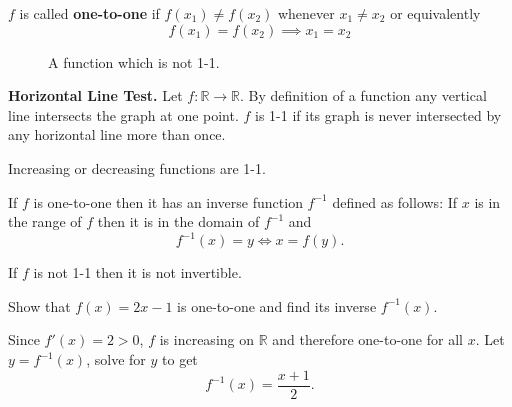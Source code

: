\documentclass[../main.tex]{subfiles}
\begin{document}
  \begin{definition}
    $f$ is called \textbf{one-to-one} if $f(x_1) \neq f(x_2)$ whenever $x_1 \neq x_2$ or equivalently
    \[
      f(x_1) = f(x_2) \implies x_1 = x_2
    \]
  \end{definition}

  \begin{figure}[H]
   \centering
   
   \caption{A function which is not 1-1.}
 \end{figure}

 \textbf{Horizontal Line Test.}
 Let $f: \mathbb{R} \to \mathbb{R}$. By definition of a function any vertical line intersects the graph at one point. $f$ is 1-1 if its graph is never intersected by any horizontal line more than once.

 \begin{theorem}
  Increasing or decreasing functions are 1-1.
\end{theorem}

\begin{definition}
  If $f$ is one-to-one then it has an inverse function $f^{-1}$ defined as follows: If $x$ is in the range of $f$ then it is in the domain of $f^{-1}$ and
  \[
    f^{-1}(x) = y \iff x = f(y).
  \]
\end{definition}
If $f$ is not 1-1 then it is not invertible.

\begin{example}
  Show that $f(x) = 2x -1$ is one-to-one and find its inverse $f^{-1}(x)$.
\end{example}
\begin{solution}
  Since $f'(x) = 2 >0$, $f$ is increasing on $\mathbb{R}$ and therefore one-to-one for all $x$. Let $y = f^{-1}(x)$, solve for $y$ to get
  \[
    f^{-1}(x) = \frac{x+1}{2}.
  \]
\end{solution}
\end{document}
